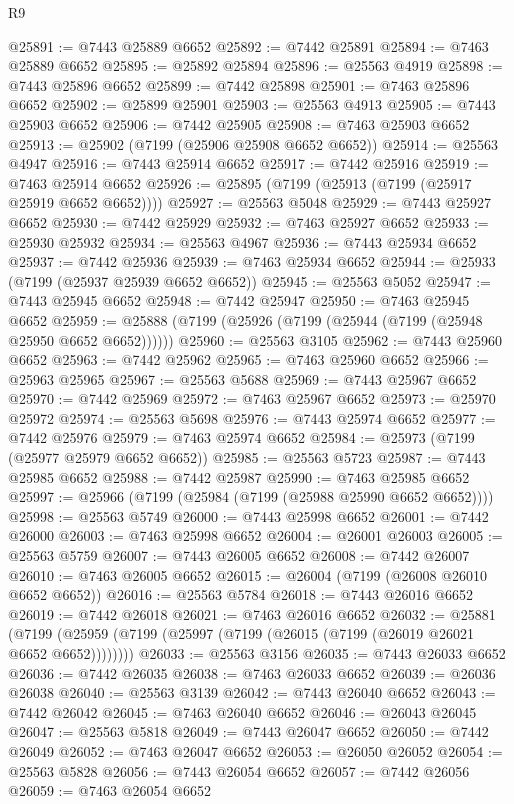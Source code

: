 \begin{lexlean}{R9}
\begin{coremodule}
@25891 := @7443 @25889 @6652
@25892 := @7442 @25891
@25894 := @7463 @25889 @6652
@25895 := @25892 @25894
@25896 := @25563 @4919
@25898 := @7443 @25896 @6652
@25899 := @7442 @25898
@25901 := @7463 @25896 @6652
@25902 := @25899 @25901
@25903 := @25563 @4913
@25905 := @7443 @25903 @6652
@25906 := @7442 @25905
@25908 := @7463 @25903 @6652
@25913 := @25902 (@7199 (@25906 @25908 @6652 @6652))
@25914 := @25563 @4947
@25916 := @7443 @25914 @6652
@25917 := @7442 @25916
@25919 := @7463 @25914 @6652
@25926 := @25895 (@7199 (@25913 (@7199 (@25917 @25919 @6652 @6652))))
@25927 := @25563 @5048
@25929 := @7443 @25927 @6652
@25930 := @7442 @25929
@25932 := @7463 @25927 @6652
@25933 := @25930 @25932
@25934 := @25563 @4967
@25936 := @7443 @25934 @6652
@25937 := @7442 @25936
@25939 := @7463 @25934 @6652
@25944 := @25933 (@7199 (@25937 @25939 @6652 @6652))
@25945 := @25563 @5052
@25947 := @7443 @25945 @6652
@25948 := @7442 @25947
@25950 := @7463 @25945 @6652
@25959 := @25888 (@7199 (@25926 (@7199 (@25944 (@7199 (@25948 @25950 @6652 @6652))))))
@25960 := @25563 @3105
@25962 := @7443 @25960 @6652
@25963 := @7442 @25962
@25965 := @7463 @25960 @6652
@25966 := @25963 @25965
@25967 := @25563 @5688
@25969 := @7443 @25967 @6652
@25970 := @7442 @25969
@25972 := @7463 @25967 @6652
@25973 := @25970 @25972
@25974 := @25563 @5698
@25976 := @7443 @25974 @6652
@25977 := @7442 @25976
@25979 := @7463 @25974 @6652
@25984 := @25973 (@7199 (@25977 @25979 @6652 @6652))
@25985 := @25563 @5723
@25987 := @7443 @25985 @6652
@25988 := @7442 @25987
@25990 := @7463 @25985 @6652
@25997 := @25966 (@7199 (@25984 (@7199 (@25988 @25990 @6652 @6652))))
@25998 := @25563 @5749
@26000 := @7443 @25998 @6652
@26001 := @7442 @26000
@26003 := @7463 @25998 @6652
@26004 := @26001 @26003
@26005 := @25563 @5759
@26007 := @7443 @26005 @6652
@26008 := @7442 @26007
@26010 := @7463 @26005 @6652
@26015 := @26004 (@7199 (@26008 @26010 @6652 @6652))
@26016 := @25563 @5784
@26018 := @7443 @26016 @6652
@26019 := @7442 @26018
@26021 := @7463 @26016 @6652
@26032 := @25881
    (@7199 (@25959 (@7199 (@25997 (@7199 (@26015 (@7199 (@26019 @26021 @6652 @6652))))))))
@26033 := @25563 @3156
@26035 := @7443 @26033 @6652
@26036 := @7442 @26035
@26038 := @7463 @26033 @6652
@26039 := @26036 @26038
@26040 := @25563 @3139
@26042 := @7443 @26040 @6652
@26043 := @7442 @26042
@26045 := @7463 @26040 @6652
@26046 := @26043 @26045
@26047 := @25563 @5818
@26049 := @7443 @26047 @6652
@26050 := @7442 @26049
@26052 := @7463 @26047 @6652
@26053 := @26050 @26052
@26054 := @25563 @5828
@26056 := @7443 @26054 @6652
@26057 := @7442 @26056
@26059 := @7463 @26054 @6652

\end{coremodule}
\end{lexlean}
